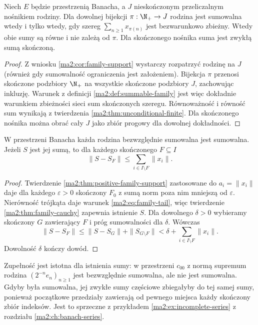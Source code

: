 \begin{twierdzenie}
\label{ma2:thm:family-enumeration}
Niech $E$ będzie przestrzenią Banacha, a $J$
nieskończonym przeliczalnym nośnikiem rodziny.
Dla dowolnej bijekcji $\pi:\N_+\to J$ rodzina jest
sumowalna wtedy i tylko wtedy, gdy szereg
$\sum_{n\ge1}x_{\pi(n)}$ jest bezwarunkowo zbieżny.
Wtedy obie sumy są równe i nie zależą od $\pi$.
Dla skończonego nośnika suma jest zwykłą sumą skończoną.
\end{twierdzenie}
\begin{proof}
Z wniosku \ref{ma2:cor:family-support} wystarczy
rozpatrzyć rodzinę na $J$ (również gdy sumowalność
ograniczenia jest założeniem). Bijekcja $\pi$
przenosi skończone podzbiory $\N_+$ na wszystkie
skończone podzbiory $J$, zachowując inkluzję.
Warunek z definicji \ref{ma2:def:summable-family}
jest więc dokładnie warunkiem zbieżności sieci sum
skończonych szeregu. Równoważność i równość sum
wynikają z twierdzenia \ref{ma2:thm:unconditional-finite}.
Dla skończonego nośnika można obrać cały $J$ jako
zbiór progowy dla dowolnej dokładności.
\end{proof}

\begin{twierdzenie}
\label{ma2:thm:absolute-family}
W przestrzeni Banacha każda rodzina bezwzględnie
sumowalna jest sumowalna. Jeżeli $S$ jest jej sumą,
to dla każdego skończonego $F\subseteq I$
\[
 \|S-S_F\|\le\sum_{i\in I\setminus F}\|x_i\|.
\]
\end{twierdzenie}
\begin{proof}
Twierdzenie \ref{ma2:thm:positive-family-support}
zastosowane do $a_i=\|x_i\|$ daje dla każdego
$\varepsilon>0$ skończony $F_0$ z sumą norm poza
nim mniejszą od $\varepsilon$. Nierówność trójkąta
daje warunek \eqref{ma2:eq:family-tail}, więc
twierdzenie \ref{ma2:thm:family-cauchy} zapewnia
istnienie $S$. Dla dowolnego $\delta>0$ wybieramy
skończony $G$ zawierający $F$ i próg sumowalności
dla $\delta$. Wówczas
\[
 \|S-S_F\|\le\|S-S_G\|+\|S_{G\setminus F}\|
 <\delta+\sum_{i\in I\setminus F}\|x_i\|.
\]
Dowolność $\delta$ kończy dowód.
\end{proof}

\begin{uwaga}
Zupełność jest istotna dla istnienia sumy: w przestrzeni
$c_{00}$ z normą supremum rodzina $(2^{-n}e_n)_{n\ge1}$
jest bezwzględnie sumowalna, ale nie jest sumowalna.
Gdyby była sumowalna, jej zwykłe sumy częściowe
zbiegałyby do tej samej sumy, ponieważ początkowe
przedziały zawierają od pewnego miejsca każdy
skończony zbiór indeksów. Jest to sprzeczne z przykładem
\ref{ma2:ex:incomplete-series} z rozdziału
\ref{ma2:ch:banach-series}.
\end{uwaga}


